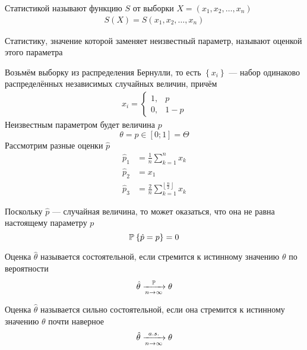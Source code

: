 \begin{definition}[Статистика]
  \label{def:statistic}
  Статистикой называют функцию $S$ от выборки
  $X= \left(x_1,x_2,\dots,x_n\right)$
  \begin{align*}
    S\left(X\right) = S\left(x_1, x_2, \dots, x_n\right)
  \end{align*}
\end{definition}
\begin{definition}[Оценка]Статистику,
  значение которой заменяет неизвестный параметр,
  называют оценкой этого параметра
\end{definition}
\begin{example}\label{example:bernulliEstimator}
  Возьмём выборку из распределения Бернулли,
  то есть $\left\{x_i\right\}$ --- набор одинаково распределённых
  независимых случайных величин, причём
  \begin{align*}
  x_i=
  \begin{cases}
    1,&p\\
    0,&1-p
  \end{cases}
  \end{align*}
  Неизвестным параметром будет величина $p$
  \begin{equation*}
    \theta = p \in \left[ 0; 1 \right] = \Theta
  \end{equation*}
  Рассмотрим разные оценки $\hat{p}$
  \begin{align*}
    \hat{p}_1&= \frac{1}{n}\sum_{k=1}^n x_k\\
    \hat{p}_2&=x_1\\
    \hat{p}_3&=
      \frac{2}{n}\sum_{k=1}^{\left\lfloor \frac{n}{2} \right\rfloor} x_k
  \end{align*}
\end{example}

\begin{remark}
Поскольку $\hat{p}$ --- случайная величина, то может оказаться,
что она не равна настоящему параметру $p$
$$\mathbb{P}_{{}}\left\{ \hat{p}=p \right\}=0$$
\end{remark}

\begin{definition}
  Оценка $\hat{\theta}$ называется состоятельной,
  если стремится к истинному значению $\theta$ по вероятности
  $$\hat{\theta}\xrightarrow[n\to\infty]{\mathbb{P}}\theta$$
\end{definition}

\begin{definition}
  Оценка $\hat{\theta}$ называется сильно состоятельной,
  если она стремится к истинному значению $\theta$ почти наверное
  $$\hat{\theta}\xrightarrow[n\to\infty]{a.s.}\theta$$
\end{definition}

